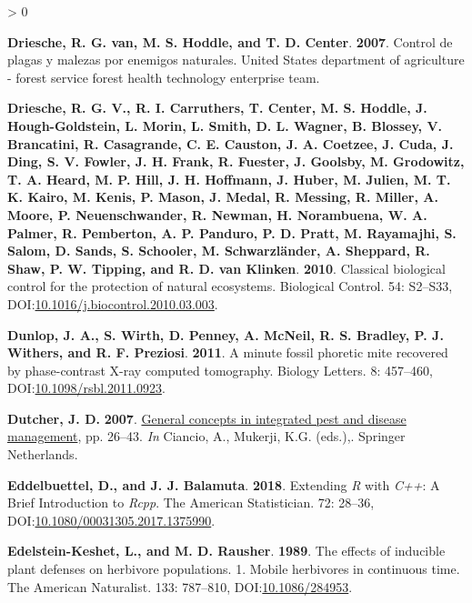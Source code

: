 \documentclass{ufdissertation}[overrideChapters] %
\newlength{\cslhangindent}
\newenvironment{CSLReferences}[2] %
 {%
  \setlength{\parindent}{0pt}
  \ifodd #1 \everypar{\setlength{\hangindent}{\cslhangindent}}\ignorespaces\fi
  \ifnum #2 > 0
  \setlength{\parskip}{#2\baselineskip}
  \fi
 }%
 {}
\begin{document}
{\begin{CSLReferences}{1}{1}
\leavevmode{}%
\textbf{Driesche, R. G. van, M. S. Hoddle, and T. D. Center}. \textbf{2007}. Control de plagas y malezas por enemigos naturales. {United States} department of agriculture - forest service forest health technology enterprise team.

\leavevmode{}%
\textbf{Driesche, R. G. V., R. I. Carruthers, T. Center, M. S. Hoddle, J. Hough-Goldstein, L. Morin, L. Smith, D. L. Wagner, B. Blossey, V. Brancatini, R. Casagrande, C. E. Causton, J. A. Coetzee, J. Cuda, J. Ding, S. V. Fowler, J. H. Frank, R. Fuester, J. Goolsby, M. Grodowitz, T. A. Heard, M. P. Hill, J. H. Hoffmann, J. Huber, M. Julien, M. T. K. Kairo, M. Kenis, P. Mason, J. Medal, R. Messing, R. Miller, A. Moore, P. Neuenschwander, R. Newman, H. Norambuena, W. A. Palmer, R. Pemberton, A. P. Panduro, P. D. Pratt, M. Rayamajhi, S. Salom, D. Sands, S. Schooler, M. Schwarzländer, A. Sheppard, R. Shaw, P. W. Tipping, and R. D. van Klinken}. \textbf{2010}. Classical biological control for the protection of natural ecosystems. Biological Control. 54: S2--S33, DOI:\href{https://doi.org/10.1016/j.biocontrol.2010.03.003}{10.1016/j.biocontrol.2010.03.003}.

\leavevmode{}%
\textbf{Dunlop, J. A., S. Wirth, D. Penney, A. McNeil, R. S. Bradley, P. J. Withers, and R. F. Preziosi}. \textbf{2011}. A minute fossil phoretic mite recovered by phase-contrast {X-ray} computed tomography. Biology Letters. 8: 457--460, DOI:\href{https://doi.org/10.1098/rsbl.2011.0923}{10.1098/rsbl.2011.0923}.

\leavevmode{}%
\textbf{Dutcher, J. D.} \textbf{2007}. \href{https://www.ebook.de/de/product/6740472/general_concepts_in_integrated_pest_and_disease_management.html}{General concepts in integrated pest and disease management}, pp. 26--43. \emph{In} Ciancio, A., Mukerji, K.G. (eds.),. Springer Netherlands.

\leavevmode{}%
\textbf{Eddelbuettel, D., and J. J. Balamuta}. \textbf{2018}. {Extending \emph{R} with \emph{C++}: A Brief Introduction to \emph{Rcpp}}. The American Statistician. 72: 28--36, DOI:\href{https://doi.org/10.1080/00031305.2017.1375990}{10.1080/00031305.2017.1375990}.

\leavevmode{}%
\textbf{Edelstein-Keshet, L., and M. D. Rausher}. \textbf{1989}. The effects of inducible plant defenses on herbivore populations. 1. Mobile herbivores in continuous time. The American Naturalist. 133: 787--810, DOI:\href{https://doi.org/10.1086/284953}{10.1086/284953}.


\end{CSLReferences}}
\end{document}
